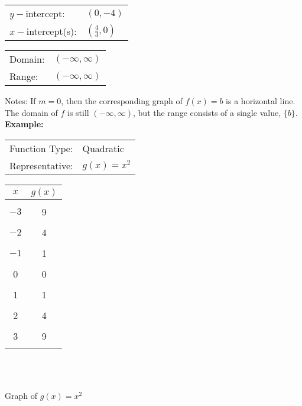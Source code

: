 \documentclass[12pt]{article}
\theoremstyle{definition}
\begin{document}
\begin{multicols}{2}
\begin{tabular}{ll}
$y-$intercept: & $(0,-4)$\\
$x-$intercept(s): & $\left(\frac{4}{3},0\right)$
\end{tabular}

\columnbreak
\begin{tabular}{ll}
Domain: & $(-\infty,\infty)$\\
Range: & $(-\infty,\infty)$
\end{tabular}
\end{multicols}
Notes: If $m=0$, then the corresponding graph of $f(x)=b$ is a horizontal line.  The domain of $f$ is still $(-\infty,\infty)$, but the range consists of a single value, $\{b\}$.
\newpage
{\bf Example:} 
\begin{multicols}{2}
\begin{tabular}{ll}
Function Type: & Quadratic\\
Representative: &$g(x)=x^2$
\end{tabular}
\begin{center}
\begin{tabular}{c|c}
	$x$ & $g(x)$\\
	\hline
 & \\
 $-3$ & 9\\
 & \\
 $-2$ & 4\\
 & \\
 $-1$ & 1\\
 & \\
 0 & 0\\
 & \\
 1 & 1\\
 & \\
 2 & 4\\
 & \\
 3 & 9\\
 & \\
\end{tabular}
\end{center}
~\\
~\\
\begin{center}
Graph of $g(x)=x^2$
\end{center}
\end{multicols}
\end{document}
